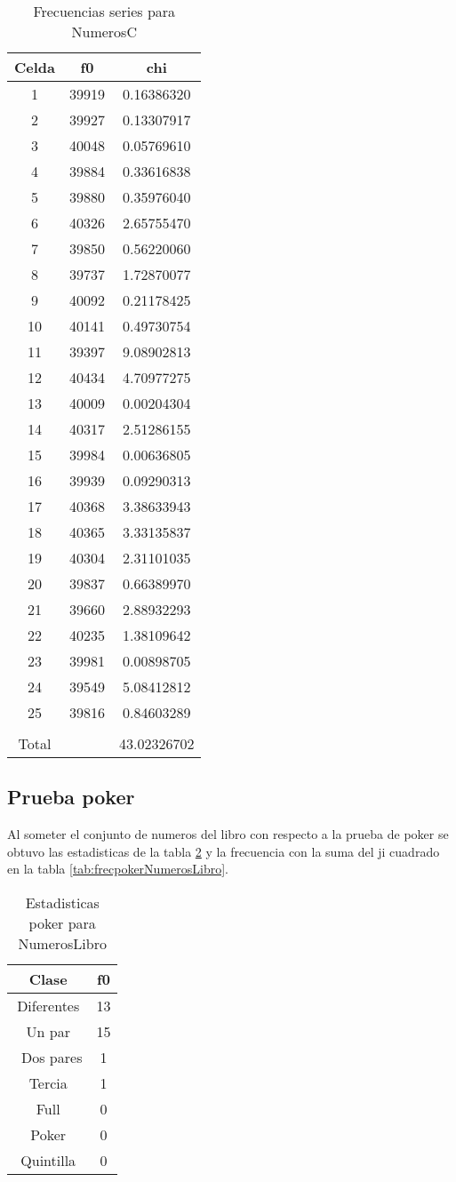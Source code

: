\documentclass[a4paper]{article}
\begin{document}
\begin{table}
\centering
\begin{tabular}{ccc}
\\\hline
Celda&f0&chi\\\hline
1&39919&0.16386320\\
2&39927&0.13307917\\
3&40048&0.05769610\\
4&39884&0.33616838\\
5&39880&0.35976040\\
6&40326&2.65755470\\
7&39850&0.56220060\\
8&39737&1.72870077\\
9&40092&0.21178425\\
10&40141&0.49730754\\
11&39397&9.08902813\\
12&40434&4.70977275\\
13&40009&0.00204304\\
14&40317&2.51286155\\
15&39984&0.00636805\\
16&39939&0.09290313\\
17&40368&3.38633943\\
18&40365&3.33135837\\
19&40304&2.31101035\\
20&39837&0.66389970\\
21&39660&2.88932293\\
22&40235&1.38109642\\
23&39981&0.00898705\\
24&39549&5.08412812\\
25&39816&0.84603289\\
\\\hline
Total & &43.02326702\\\hline
\end{tabular}
\caption{\label{tab:frecseriesNumerosC}Frecuencias series para NumerosC}
\end{table}


\subsection{Prueba poker}
Al someter el conjunto de numeros del libro con respecto a la prueba de poker se obtuvo las estadisticas de la tabla \ref{tab:estadistpokerNumerosLibro} y la frecuencia con la suma del ji cuadrado en la tabla \ref{tab:frecpokerNumerosLibro}.
\begin{table}
\centering
\begin{tabular}{cc}
\\\hline
Clase&f0\\\hline
Diferentes&13\\
Un par&15\\\
Dos pares&1\\
Tercia&1\\
Full&0\\
Poker&0\\
Quintilla&0\\\hline
\end{tabular}
\caption{\label{tab:estadistpokerNumerosLibro}Estadisticas poker para NumerosLibro}
\end{table}
\end{document}
